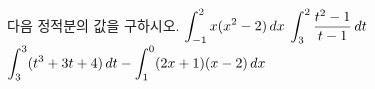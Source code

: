 다음 정적분의 값을 구하시오.
 $\displaystyle\int_{-1}^{2}x(x^2-2)\mkern3mu dx$
 $\displaystyle\int_{3}^{2}\dfrac{t^2-1}{t-1}\mkern3mu dt$
 $\displaystyle\int_{3}^{3}(t^3+3t+4)\mkern3mu dt-\int_{1}^{0}(2x+1)(x-2)\mkern3mu dx$
